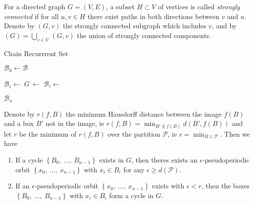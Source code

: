\begin{definition}
    For a directed graph $G = (V, E)$, a subset $H \subset V$ of vertices is called 
    \emph{strongly connected} if for all $u, v \in H$ there exist paths in both 
    directions between $v$ and $u$. Denote by $(G, v)$ the strongly connected
    subgraph which includes $v$, and by 
    $(G) = \bigcup_{v \in V}\,$$(G, v)$ 
    the union of strongly connected components.
\end{definition}

\begin{algorithm}
    \caption{Chain Recurrrent Set}
    \label{alg:chain}

    \begin{algorithmic}[1]
        \State $\mathcal{B}_0 \gets \mathcal{B}$

            \State $\mathcal{B}_i \gets$ 
            \State $G\, \gets$ 
            \State $\mathcal{B}_i \gets$ 
        \EndFor

        \State \Return $\mathcal{B}_n$
    \end{algorithmic}
\end{algorithm}

\begin{proposition}
    Denote by $r(f, B)$ the minimum Hausdorff distance between the image $f(B)$ and a 
    box $B'$ not in the image, ie $r(f, B) = \min_{B' \notin f(B)} d(B', f(B))$ and let 
    $r$ be the minimum of $r(f, B)$ over the partition $\mathcal{P}$, ie 
    $r = \min_{B \in \mathcal{P}}$. Then we have

    \begin{enumerate}
        \item If a cycle $\left\{ B_0,\ \ldots,\ B_{n-1} \right\}$ exists in $G$, then 
        theres exists an $\epsilon$-pseudoperiodic orbit 
        $\left\{ x_0,\ \ldots,\ x_{n-1} \right\}$ with $x_i \in B_i$ for any 
        $\epsilon \geq d(\mathcal{P})$. 
        \item If an $\epsilon$-pseudoperiodic orbit 
        $\left\{ x_0,\ \ldots,\ x_{n-1} \right\}$ exists with $\epsilon < r$, then the 
        boxes $\left\{ B_0,\ \ldots,\ B_{n-1} \right\}$ with $x_i \in B_i$ form a cycle in 
        $G$. 
    \end{enumerate}

\end{proposition}

